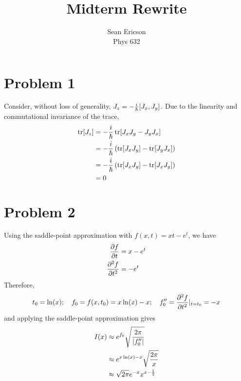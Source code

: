 \documentclass[12pt]{article}
\begin{document}
	
\title{Midterm Rewrite}
\author{Sean Ericson \\ Phys 632}
\maketitle

\section*{Problem 1}
Consider, without loss of generality, $J_z = -\frac{i}{\hbar}\comm{J_x}{J_y}$. Due to the linearity and commutational invariance of the trace,
\begin{align*}
    \tr[J_z] &= -\frac{i}{\hbar}\tr[J_xJ_y - J_yJ_x] \\
    & = -\frac{i}{\hbar}\left(\tr[J_xJ_y] - \tr[J_yJ_x]\right) \\
    & = -\frac{i}{\hbar}\left(\tr[J_xJ_y] - \tr[J_xJ_y]\right) \\
    & = 0
\end{align*}

\section*{Problem 2}
Using the saddle-point approximation with $f(x, t) = xt-e^t$, we have
\begin{align*}
    \pdv{f}{t} &= x - e^t \\
    \pdv[2]{f}{t} &= -e^t
\end{align*}
Therefore,
\[ t_0 = \ln(x); \quad f_0 = f(x, t_0) = x\ln(x)-x; \quad f''_0 = \pdv[2]{f}{t}|_{t=t_0} = -x \]
and applying the saddle-point approximation gives
\begin{align*}
    I(x) &\approx e^{f_0}\sqrt{\frac{2\pi}{\abs{f''_0}}} \\
    &\approx e^{x\ln(x)-x}\sqrt{\frac{2\pi}{x}} \\
    &\approx \sqrt{2\pi}e^{-x}x^{x-\frac{1}{2}}
\end{align*}
\end{document}
